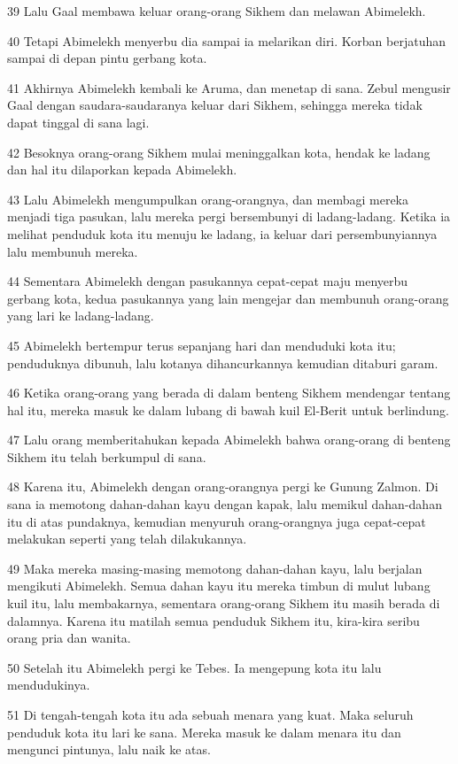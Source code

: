 \par 39 Lalu Gaal membawa keluar orang-orang Sikhem dan melawan Abimelekh.
\par 40 Tetapi Abimelekh menyerbu dia sampai ia melarikan diri. Korban berjatuhan sampai di depan pintu gerbang kota.
\par 41 Akhirnya Abimelekh kembali ke Aruma, dan menetap di sana. Zebul mengusir Gaal dengan saudara-saudaranya keluar dari Sikhem, sehingga mereka tidak dapat tinggal di sana lagi.
\par 42 Besoknya orang-orang Sikhem mulai meninggalkan kota, hendak ke ladang dan hal itu dilaporkan kepada Abimelekh.
\par 43 Lalu Abimelekh mengumpulkan orang-orangnya, dan membagi mereka menjadi tiga pasukan, lalu mereka pergi bersembunyi di ladang-ladang. Ketika ia melihat penduduk kota itu menuju ke ladang, ia keluar dari persembunyiannya lalu membunuh mereka.
\par 44 Sementara Abimelekh dengan pasukannya cepat-cepat maju menyerbu gerbang kota, kedua pasukannya yang lain mengejar dan membunuh orang-orang yang lari ke ladang-ladang.
\par 45 Abimelekh bertempur terus sepanjang hari dan menduduki kota itu; penduduknya dibunuh, lalu kotanya dihancurkannya kemudian ditaburi garam.
\par 46 Ketika orang-orang yang berada di dalam benteng Sikhem mendengar tentang hal itu, mereka masuk ke dalam lubang di bawah kuil El-Berit untuk berlindung.
\par 47 Lalu orang memberitahukan kepada Abimelekh bahwa orang-orang di benteng Sikhem itu telah berkumpul di sana.
\par 48 Karena itu, Abimelekh dengan orang-orangnya pergi ke Gunung Zalmon. Di sana ia memotong dahan-dahan kayu dengan kapak, lalu memikul dahan-dahan itu di atas pundaknya, kemudian menyuruh orang-orangnya juga cepat-cepat melakukan seperti yang telah dilakukannya.
\par 49 Maka mereka masing-masing memotong dahan-dahan kayu, lalu berjalan mengikuti Abimelekh. Semua dahan kayu itu mereka timbun di mulut lubang kuil itu, lalu membakarnya, sementara orang-orang Sikhem itu masih berada di dalamnya. Karena itu matilah semua penduduk Sikhem itu, kira-kira seribu orang pria dan wanita.
\par 50 Setelah itu Abimelekh pergi ke Tebes. Ia mengepung kota itu lalu mendudukinya.
\par 51 Di tengah-tengah kota itu ada sebuah menara yang kuat. Maka seluruh penduduk kota itu lari ke sana. Mereka masuk ke dalam menara itu dan mengunci pintunya, lalu naik ke atas.
